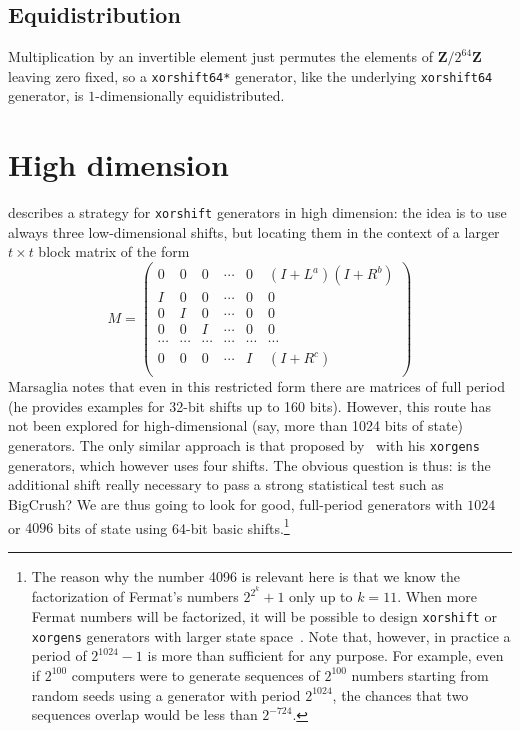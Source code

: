 \documentclass{acmsmalltr}
\newcommand{\Z}{\mathbf Z}
\newcommand{\xorshift}[1][]{\texttt{xorshift#1}\xspace}
\newcommand{\xorshifts}[1][]{\texttt{xorshift#1*}\xspace}
\newcommand{\xorgens}[1][]{\texttt{xorgens#1}\xspace}
\begin{document}
\subsection{Equidistribution}
\label{sec:equidistlcg}

Multiplication by an invertible element just permutes the elements of
$\Z/2^{64}\Z$ leaving zero fixed, so a \xorshifts[64] generator, like the
underlying \xorshift[64] generator, is $1$-dimensionally
equidistributed.





\section{High dimension}
\label{sec:high}

 describes a strategy for \xorshift generators in high dimension: the idea
is to use always three low-dimensional shifts, but locating them in the context
of a larger $t\times t$ block matrix of the form
\[
M=\left(\begin{matrix}
0 & 0 & 0 & \cdots & 0 & ( I + L^a ) ( I + R^b )\\
I & 0 & 0 & \cdots & 0 & 0\\
0 & I & 0 & \cdots & 0 & 0\\
0 & 0 & I & \cdots & 0 & 0\\
\cdots&\cdots&\cdots&\cdots&\cdots&\cdots\\
0 & 0 & 0 & \cdots & I & ( I + R^c ) \\
\end{matrix}\right)
\]
Marsaglia notes that even in this restricted form there are matrices of full period (he provides examples
for 32-bit shifts up to 160 bits). However, 
this route has not been explored for high-dimensional (say, more than 1024 bits
of state) generators. The only similar approach is that proposed by~ with his \xorgens generators, which however uses
four shifts. The obvious question is thus: is the additional shift
really necessary to pass a strong statistical test such as BigCrush? We are thus
going to look for good, full-period generators with $1024$ or $4096$ bits of state using 64-bit basic shifts.\footnote{The reason why the number 4096 is
relevant here is that we know the factorization of Fermat's numbers $2^{2^k}+1$
only up to $k=11$. When more Fermat numbers will be factorized, it will be
possible to design \xorshift or \xorgens generators with larger state
space~\cite{BreSLPRNGUSX}. Note that, however, in practice a period of
$2^{1024}-1$ is more than sufficient for any purpose. For example, even if
$2^{100}$ computers were to generate sequences of $2^{100}$ numbers starting
from random seeds using a generator with period $2^{1024}$, the chances that two
sequences overlap would be less than $2^{-724}$.} 
\end{document}
